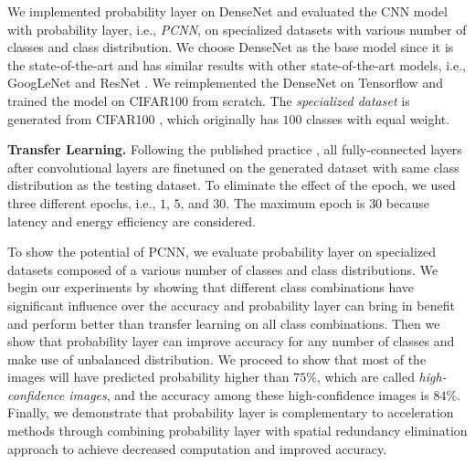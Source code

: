 \documentclass[pageno]{jpaper}
\begin{document}
We implemented probability layer on DenseNet \cite{huang2017densely} and evaluated the CNN model with probability layer, i.e., \textit{PCNN}, on specialized datasets with various number of classes and class distribution. We choose DenseNet as the base model since it is the state-of-the-art and has similar results with other state-of-the-art models, i.e., GoogLeNet \cite{szegedy2015going} and ResNet \cite{he2016deep}. We reimplemented the DenseNet on Tensorflow \cite{abadi2016tensorflow} and trained the model on CIFAR100 \cite{krizhevsky2009learning} from scratch. The \textit{specialized dataset} is generated from CIFAR100 \cite{krizhevsky2009learning}, which originally has $100$ classes with equal weight. 

\textbf{Transfer Learning.} Following the published practice \cite{doersch2015unsupervised, han2016mcdnn, oquab2014learning, shen2016fast, yosinski2014transferable}, all fully-connected layers after convolutional layers are finetuned on the generated dataset with same class distribution as the testing dataset. To eliminate the effect of the epoch, we used three different epochs, i.e., $1$, $5$, and $30$. The maximum epoch is $30$ because latency and energy efficiency are considered.

To show the potential of PCNN, we evaluate probability layer on specialized datasets composed of a various number of classes and class distributions. We begin our experiments by showing that different class combinations have significant influence over the accuracy and probability layer can bring in benefit and perform better than transfer learning on all class combinations. Then we show that probability layer can improve accuracy for any number of classes and make use of unbalanced distribution. We proceed to show that most of the images will have predicted probability higher than $75\%$, which are called \textit{high-confidence images}, and the accuracy among these high-confidence images is $84\%$. Finally, we demonstrate that probability layer is complementary to acceleration methods through combining probability layer with spatial redundancy elimination approach \cite{figurnov2016perforatedcnns} to achieve decreased computation and improved accuracy.
\end{document}
